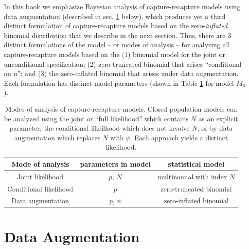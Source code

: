 In this book we emphasize Bayesian analysis of capture-recapture
models using data augmentation
(described in sec. \ref{closed.sec.da} below), which 
produces yet a third distinct formulation of capture-recapture models
based on the zero-{\it inflated} binomial distribution that we
describe in the next section.  Thus, there are 3 distinct formulations
of the model -- or modes of analysis -- for analyzing all
capture-recapture models based on the (1) binomial model for the joint
or unconditional specification; (2) zero-truncated binomial that
arises ``conditional on $n$''; and (3) the zero-inflated binomial that
arises under data augmentation.  Each formulation has distinct
model parameters (shown in Table \ref{tab.3.modes} for
model $M_0$).


\begin{table}  
\centering
\caption{Modes of analysis of capture-recapture models. Closed
  population models can be analyzed using the joint or ``full
  likelihood'' which contains $N$ as an explicit parameter, the
  conditional likeilhood which does not involve $N$, or by data
  augmentation which replaces $N$ with $\psi$. Each approach yields a
  distinct likelihood.}
\begin{tabular}{ccc}
Mode of analysis & parameters in model & statistical model \\ \hline
Joint likelihood                &	$p$, $N$	&	multinomial with index $N$\\
Conditional likelihood 		&	$p$	&	zero-truncated binomial \\
Data augmentation		&	$p$, $\psi$	&	zero-inflated binomial\\
\end{tabular}
\label{tab.3.modes}
\end{table}



\section{Data Augmentation }
\label{closed.sec.da}


